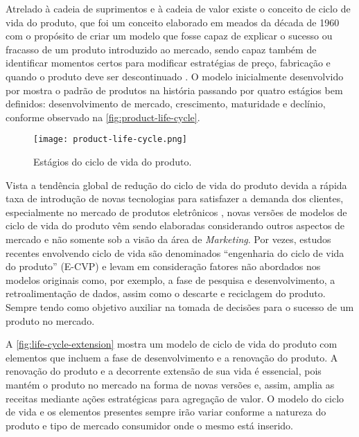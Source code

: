 	Atrelado à cadeia de suprimentos e à cadeia de valor existe o conceito de ciclo de vida do produto, que foi um conceito elaborado em meados da década de 1960 com o propósito de criar um modelo que fosse capaz de explicar o sucesso ou fracasso de um produto introduzido ao mercado, sendo capaz também de identificar momentos certos para modificar estratégias de preço, fabricação e quando o produto deve ser descontinuado \cite{cao2012lifecycle}. O modelo inicialmente desenvolvido por  mostra o padrão de produtos na história passando por quatro estágios bem definidos: desenvolvimento de mercado, crescimento, maturidade e declínio, conforme observado na \autoref{fig:product-life-cycle}.
	
	\begin{figure}[htb]
		\centering
		\caption{Estágios do ciclo de vida do produto.}
		\label{fig:product-life-cycle}
		\texttt{[image: product-life-cycle.png]}
	\end{figure}

	Vista a tendência global de redução do ciclo de vida do produto devida a rápida taxa de introdução de novas tecnologias para satisfazer a demanda dos clientes, especialmente no mercado de produtos eletrônicos \cite{trappey2008lifecycle}, novas versões de modelos de ciclo de vida do produto vêm sendo elaboradas considerando outros aspectos de mercado e não somente sob a visão da área de \textit{Marketing}. Por vezes, estudos recentes envolvendo ciclo de vida são denominados ``engenharia do ciclo de vida do produto'' (E-CVP) \cite{cao2012lifecycle} e levam em consideração fatores não abordados nos modelos originais como, por exemplo, a fase de pesquisa e desenvolvimento, a retroalimentação de dados, assim como o descarte e reciclagem do produto. Sempre tendo como objetivo auxiliar na tomada de decisões para o sucesso de um produto no mercado.
	
	A \autoref{fig:life-cycle-extension} mostra um modelo de ciclo de vida do produto com elementos que incluem a fase de desenvolvimento e a renovação do produto. A renovação do produto e a decorrente extensão de sua vida é essencial, pois mantém o produto no mercado na forma de novas versões e, assim, amplia as receitas mediante ações estratégicas para agregação de valor. O modelo do ciclo de vida e os elementos presentes sempre irão variar conforme a natureza do produto e tipo de mercado consumidor onde o mesmo está inserido.
	
